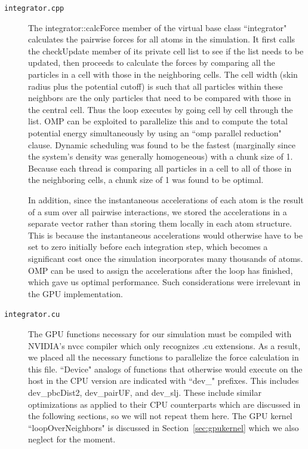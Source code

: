 \documentclass[12pt]{article}
\begin{document}
\begin{description}
\item[\texttt{integrator.cpp}]
The integrator::calcForce member of the virtual base class ``integrator" calculates the pairwise forces for all atoms in the simulation.  It first calls the checkUpdate member of its private cell list to see if the list needs to be updated, then proceeds to calculate the forces by comparing all the particles in a cell with those in the neighboring cells.  The cell width (skin radius plus the potential cutoff) is such that all particles within these neighbors are the only particles that need to be compared with those in the central cell.  Thus the loop executes by going cell by cell through the list.  OMP can be exploited to parallelize this and to compute the total potential energy simultaneously by using an ``omp parallel reduction" clause.  Dynamic scheduling was found to be the fastest (marginally since the system's density was generally homogeneous) with a chunk size of 1.  Because each thread is comparing all particles in a cell to all of those in the neighboring cells, a chunk size of 1 was found to be optimal.

In addition, since the instantaneous accelerations of each atom is the result of a sum over all pairwise interactions, we stored the accelerations in a separate vector rather than storing them locally in each atom structure.  This is because the instantaneous accelerations would otherwise have to be set to zero initially before each integration step, which becomes a significant cost once the simulation incorporates many thousands of atoms.  OMP can be used to assign the accelerations after the loop has finished, which gave us optimal performance.  Such considerations were irrelevant in the GPU implementation.

\item[\texttt{integrator.cu}]
The GPU functions necessary for our simulation must be compiled with NVIDIA's nvcc compiler which only recognizes .cu extensions.  As a result, we placed all the necessary functions to parallelize the force calculation in this file.  ``Device" analogs of functions that otherwise would execute on the host in the CPU version are indicated with ``dev\_" prefixes.  This includes dev\_pbcDist2, dev\_pairUF, and dev\_slj.  These include similar optimizations as applied to their CPU counterparts which are discussed in the following sections, so we will not repeat them here.  The GPU kernel ``loopOverNeighbors" is discussed in Section~\ref{sec:gpukernel} which we also neglect for the moment.


\end{description}
\end{document}
